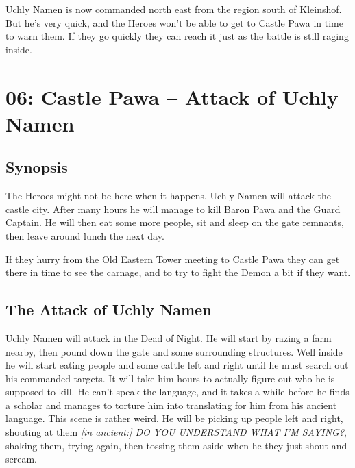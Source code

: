 Uchly Namen is now commanded north east from the region south of Kleinshof. But he's very quick, and the Heroes won't be able to get to Castle Pawa in time to warn them. If they go quickly they can reach it just as the battle is still raging inside.


%




















\clearpage
{}
\section*{06: Castle Pawa -- Attack of Uchly Namen}


\subsection*{Synopsis}
The Heroes might not be here when it happens. Uchly Namen will attack the castle city. After many hours he will manage to kill Baron Pawa and the Guard Captain. He will then eat some more people, sit and sleep on the gate remnants, then leave around lunch the next day.

If they hurry from the Old Eastern Tower meeting to Castle Pawa they can get there in time to see the carnage, and to try to fight the Demon a bit if they want.


\subsection*{The Attack of Uchly Namen}
Uchly Namen will attack in the Dead of Night. He will start by razing a farm nearby, then pound down the gate and some surrounding structures. Well inside he will start eating people and some cattle left and right until he must search out his commanded targets. It will take him hours to actually figure out who he is supposed to kill. He can't speak the language, and it takes a while before he finds a scholar and manages to torture him into translating for him from his ancient language. This scene is rather weird. He will be picking up people left and right, shouting at them \emph{[in ancient:] DO YOU UNDERSTAND WHAT I'M SAYING?}, shaking them, trying again, then tossing them aside when he they just shout and scream.

